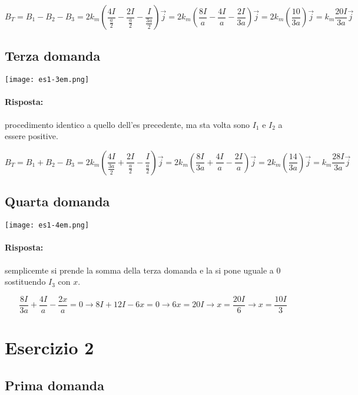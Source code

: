 $$B_T = B_1 - B_2 - B_3 = 2k_m(\frac{4I}{\frac{a}{2}} - \frac{2I}{\frac{a}{2}} -\frac{I}{\frac{3a}{2}}) \vec{j} = 2k_m(\frac{8I}{a} - \frac{4I}{a} -\frac{2I}{3a}) \vec{j} = 2k_m (\frac{10}{3a}) \vec{j} = k_m \frac{20I}{3a} \vec{j}$$

\subsection{Terza domanda}

\begin{center}
  \texttt{[image: es1-3em.png]}
\end{center}

\paragraph{Risposta:} procedimento identico a quello dell'es precedente, ma sta volta sono $I_1$ e $I_2$ a essere positive.

$$B_T = B_1 + B_2 - B_3 = 2k_m(\frac{4I}{\frac{3a}{2}} + \frac{2I}{\frac{a}{2}} -\frac{I}{\frac{a}{2}}) \vec{j} = 2k_m(\frac{8I}{3a} + \frac{4I}{a} -\frac{2I}{a}) \vec{j} = 2k_m (\frac{14}{3a}) \vec{j} = k_m \frac{28I}{3a} \vec{j}$$

\subsection{Quarta domanda}

\begin{center}
  \texttt{[image: es1-4em.png]}
\end{center}

\paragraph{Risposta:} semplicemte si prende la somma della terza domanda e la si pone uguale a 0 sostituendo $I_3$ con $x$. 

$$\frac{8I}{3a} + \frac{4I}{a} -\frac{2x}{a} = 0 \rightarrow 8I + 12I - 6x = 0 \rightarrow 6x = 20I \rightarrow x = \frac{20I}{6} \rightarrow x = \frac{10I}{3}$$

\section{Esercizio 2}

\subsection{Prima domanda}

